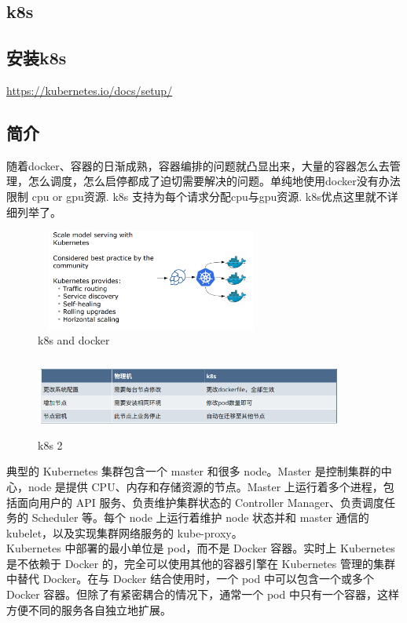 \documentclass{article}
\begin{document}
\begin{CJK*}{UTF8}{gbsn}
\section{k8s}
\subsection{安装k8s}
\url {https://kubernetes.io/docs/setup/}

\subsection{简介}
随着docker、容器的日渐成熟，容器编排的问题就凸显出来，大量的容器怎么去管理，怎么调度，怎么启停都成了迫切需要解决的问题。单纯地使用docker没有办法限制 cpu or gpu资源. k8s 支持为每个请求分配cpu与gpu资源. k8s优点这里就不详细列举了。
\begin{figure}[H]
\centering
\includegraphics[width=3in,height=1.3in]{k8s}
\caption{k8s and docker}
\end{figure}

\begin{figure}[H]
\centering
\includegraphics[width=4in,height=1in]{k8s2}
\caption{k8s 2}
\end{figure}

典型的 Kubernetes 集群包含一个 master 和很多 node。Master 是控制集群的中心，node 是提供 CPU、内存和存储资源的节点。Master 上运行着多个进程，包括面向用户的 API 服务、负责维护集群状态的 Controller Manager、负责调度任务的 Scheduler 等。每个 node 上运行着维护 node 状态并和 master 通信的 kubelet，以及实现集群网络服务的 kube-proxy。\\

Kubernetes 中部署的最小单位是 pod，而不是 Docker 容器。实时上 Kubernetes 是不依赖于 Docker 的，完全可以使用其他的容器引擎在 Kubernetes 管理的集群中替代 Docker。在与 Docker 结合使用时，一个 pod 中可以包含一个或多个 Docker 容器。但除了有紧密耦合的情况下，通常一个 pod 中只有一个容器，这样方便不同的服务各自独立地扩展。


\end{CJK*}
\end{document}
